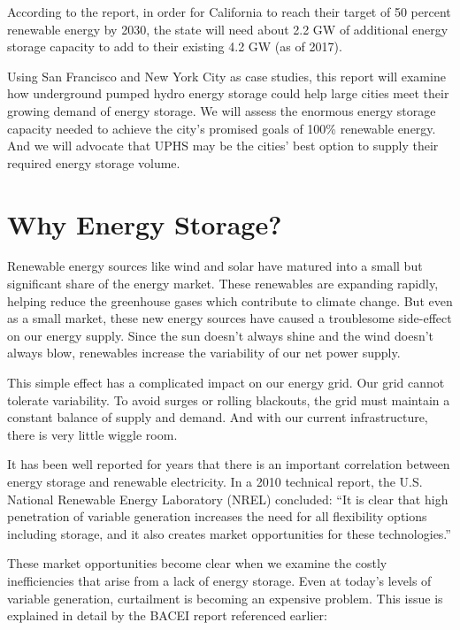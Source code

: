 \documentclass[hidelinks,12pt,a4paper]{article}
\begin{document}
According to the report, in order for California to reach their target of 50 percent renewable energy by 2030, the state will need about 2.2 GW of additional energy storage capacity to add to their existing 4.2 GW (as of 2017).\cite{EnergyStorageCaliforniaClimateandEnergyGoals}


Using San Francisco and New York City as case studies, this report will examine how underground pumped hydro energy storage could help large cities meet their growing demand of energy storage. We will assess the enormous energy storage capacity needed to achieve the city's promised goals of 100\% renewable energy. And we will advocate that UPHS may be the cities' best option to supply their required energy storage volume.

\pagebreak[4]
\section{Why Energy Storage?}
Renewable energy sources like wind and solar have matured into a small but significant share of the energy market. These renewables are expanding rapidly, helping reduce the greenhouse gases which contribute to climate change. But even as a small market, these new energy sources have caused a troublesome side-effect on our energy supply. Since the sun doesn’t always shine and the wind doesn’t always blow, renewables increase the variability of our net power supply.

This simple effect has a complicated impact on our energy grid. Our grid cannot tolerate variability. To avoid surges or rolling blackouts, the grid must maintain a constant balance of supply and demand. And with our current infrastructure, there is very little wiggle room.

It has been well reported for years that there is an important correlation between energy storage and renewable electricity. In a 2010 technical report, the U.S. National Renewable Energy Laboratory (NREL) concluded: “It is clear that high penetration of variable generation increases the need for all flexibility options including storage, and it also creates market opportunities for these technologies.” \cite{TheRoleOfEnergyStorageWithRenewableElectricityGeneration}

These market opportunities become clear when we examine the costly inefficiencies that arise from a lack of energy storage. Even at today's levels of variable generation, curtailment is becoming an expensive problem. This issue is explained in detail by the BACEI report referenced earlier:
\end{document}
